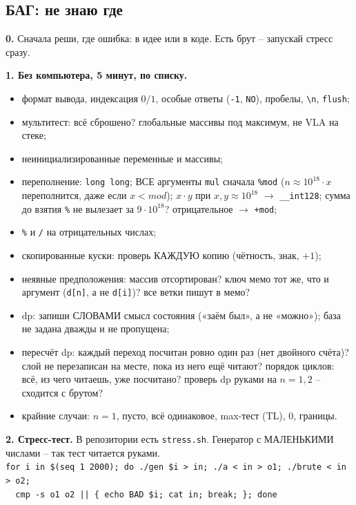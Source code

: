 \subsection{БАГ: не знаю где}
\textbf{0.} Сначала реши, где ошибка: в идее или в коде. Есть брут -- запускай стресс сразу.
\par \textbf{1. Без компьютера, 5 минут, по списку.}
\begin{itemize}
\item[\sq] формат вывода, индексация $0/1$, особые ответы (\texttt{-1}, \texttt{NO}), пробелы, \verb|\n|, \texttt{flush};
\item[\sq] мультитест: всё сброшено? глобальные массивы под максимум, не VLA на стеке;
\item[\sq] неинициализированные переменные и массивы;
\item[\sq] переполнение: \texttt{long long}; ВСЕ аргументы \texttt{mul} сначала \texttt{\%mod} ($n\approx10^{18}\cdot x$ переполнится, даже если $x<mod$); $x\cdot y$ при $x,y\approx10^{18}$ $\to$ \texttt{\_\_int128}; сумма до взятия \texttt{\%} не вылезает за $9\cdot10^{18}$? отрицательное $\to$ \texttt{+mod};
\item[\sq] \texttt{\%} и \texttt{/} на отрицательных числах;
\item[\sq] скопированные куски: проверь КАЖДУЮ копию (чётность, знак, $+1$);
\item[\sq] неявные предположения: массив отсортирован? ключ мемо тот же, что и аргумент (\texttt{d[n]}, а не \texttt{d[i]})? все ветки пишут в мемо?
\item[\sq] dp: запиши СЛОВАМИ смысл состояния («заём был», а не «можно»); база не задана дважды и не пропущена;
\item[\sq] пересчёт dp: каждый переход посчитан ровно один раз (нет двойного счёта)? слой не перезаписан на месте, пока из него ещё читают? порядок циклов: всё, из чего читаешь, уже посчитано? проверь dp руками на $n=1,2$ -- сходится с брутом?
\item[\sq] крайние случаи: $n=1$, пусто, всё одинаковое, max-тест (TL), $0$, границы.
\end{itemize}
\par \textbf{2. Стресс-тест.} В репозитории есть \texttt{stress.sh}. Генератор с МАЛЕНЬКИМИ числами -- так тест читается руками.\\
{\footnotesize\texttt{for i in \$(seq 1 2000); do ./gen \$i > in; ./a < in > o1; ./brute < in > o2;}\\\texttt{\ \ cmp -s o1 o2 || \{ echo BAD \$i; cat in; break; \}; done}}
